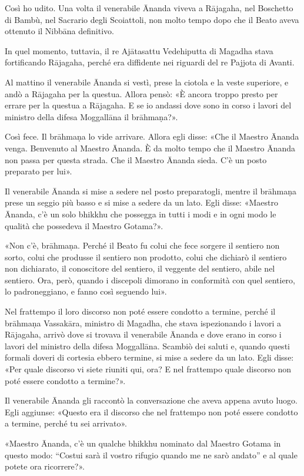  Così ho udito. Una volta il venerabile Ānanda viveva a
Rājagaha, nel Boschetto di Bambù, nel Sacrario degli Scoiattoli, non molto tempo
dopo che il Beato aveva ottenuto il Nibbāna definitivo.

In quel momento, tuttavia, il re Ajātasattu Vedehiputta di Magadha stava
fortificando Rājagaha, perché era diffidente nei riguardi del re Pajjota di
Avanti.

Al mattino il venerabile Ānanda si vestì, prese la ciotola e la veste superiore,
e andò a Rājagaha per la questua. Allora pensò: «È ancora troppo presto per
errare per la questua a Rājagaha. E se io andassi dove sono in corso i lavori
del ministro della difesa Moggallāna il brāhmaṇa?».

Così fece. Il brāhmaṇa lo vide arrivare. Allora egli disse: «Che il Maestro
Ānanda venga. Benvenuto al Maestro Ānanda. È da molto tempo che il Maestro
Ānanda non passa per questa strada. Che il Maestro Ānanda sieda. C’è un posto
preparato per lui».

Il venerabile Ānanda si mise a sedere nel posto preparatogli, mentre il brāhmaṇa
prese un seggio più basso e si mise a sedere da un lato. Egli disse: «Maestro
Ānanda, c’è un solo bhikkhu che possegga in tutti i modi e in ogni modo le
qualità che possedeva il Maestro Gotama?».

«Non c’è, brāhmaṇa. Perché il Beato fu colui che fece sorgere il sentiero non
sorto, colui che produsse il sentiero non prodotto, colui che dichiarò il
sentiero non dichiarato, il conoscitore del sentiero, il veggente del sentiero,
abile nel sentiero. Ora, però, quando i discepoli dimorano in conformità con
quel sentiero, lo padroneggiano, e fanno così seguendo lui».

Nel frattempo il loro discorso non poté essere condotto a termine, perché il
brāhmaṇa Vassakāra, ministro di Magadha, che stava ispezionando i lavori a
Rājagaha, arrivò dove si trovava il venerabile Ānanda e dove erano in corso i
lavori del ministro della difesa Moggallāna. Scambiò dei saluti e, quando questi
formali doveri di cortesia ebbero termine, si mise a sedere da un lato. Egli
disse: «Per quale discorso vi siete riuniti qui, ora? E nel frattempo quale
discorso non poté essere condotto a termine?».

Il venerabile Ānanda gli raccontò la conversazione che aveva appena avuto luogo.
Egli aggiunse: «Questo era il discorso che nel frattempo non poté essere
condotto a termine, perché tu sei arrivato».

«Maestro Ānanda, c’è un qualche bhikkhu nominato dal Maestro Gotama in questo
modo: “Costui sarà il vostro rifugio quando me ne sarò andato” e al quale potete
ora ricorrere?».

